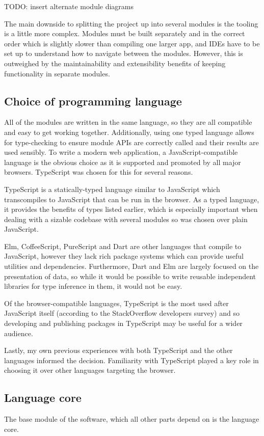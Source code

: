 \documentclass[a4paper,fleqn,twoside,12pt]{report}
\begin{document}
TODO: insert alternate module diagrams

The main downside to splitting the project up into several modules is the tooling is a little more complex. Modules must be built separately and in the correct order which is slightly slower than compiling one larger app, and IDEs have to be set up to understand how to navigate between the modules. However, this is outweighed by the maintainability and extensibility benefits of keeping functionality in separate modules.

\subsection{Choice of programming language}\label{id:h.dj2rwwqr30vu}
All of the modules are written in the same language, so they are all compatible and easy to get working together. Additionally, using one typed language allows for type-checking to ensure module APIs are correctly called and their results are used sensibly. To write a modern web application, a JavaScript-compatible language is the obvious choice as it is supported and promoted by all major browsers. TypeScript was chosen for this for several reasons.

TypeScript is a statically-typed language similar to JavaScript which transcompiles to JavaScript that can be run in the browser. As a typed language, it provides the benefits of types listed earlier, which is especially important when dealing with a sizable codebase with several modules so was chosen over plain JavaScript.

Elm, CoffeeScript, PureScript and Dart are other languages that compile to JavaScript, however they lack rich package systems which can provide useful utilities and dependencies. Furthermore, Dart and Elm are largely focused on the presentation of data, so while it would be possible to write reusable independent libraries for type inference in them, it would not be easy.

Of the browser-compatible languages, TypeScript is the most used after JavaScript itself (according to the StackOverflow developers survey) and so developing and publishing packages in TypeScript may be useful for a wider audience.

Lastly, my own previous experiences with both TypeScript and the other languages informed the decision. Familiarity with TypeScript played a key role in choosing it over other languages targeting the browser.
\subsection{Language core}\label{id:h.hggmfighusoc}
The base module of the software, which all other parts depend on is the language core.
\end{document}
